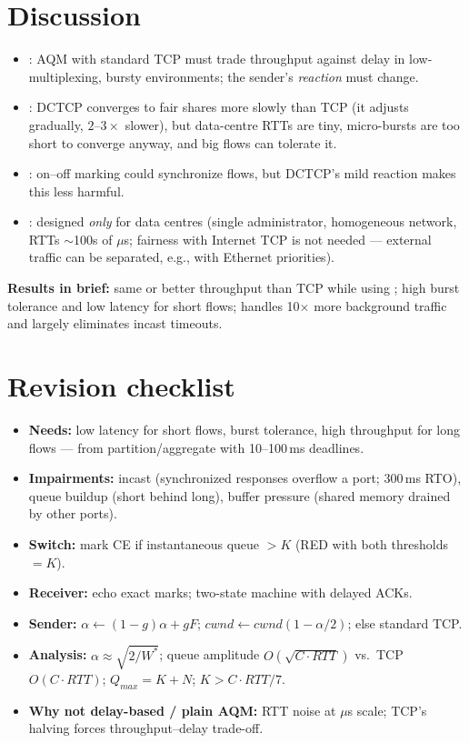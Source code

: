 \section{Discussion}
\begin{itemize}
\item {}: AQM with standard TCP must trade throughput against delay in low-multiplexing, bursty environments; the sender's \emph{reaction} must change.
\item {}: DCTCP converges to fair shares more slowly than TCP (it adjusts gradually, $2$--$3\times$ slower), but data-centre RTTs are tiny, micro-bursts are too short to converge anyway, and big flows can tolerate it.
\item {}: on--off marking could synchronize flows, but DCTCP's mild reaction makes this less harmful.
\item {}: designed \emph{only} for data centres (single administrator, homogeneous network, RTTs $\sim$100s of $\mu$s; fairness with Internet TCP is not needed --- external traffic can be separated, e.g., with Ethernet priorities).
\end{itemize}
\textbf{Results in brief:} same or better throughput than TCP while using ; high burst tolerance and low latency for short flows; handles 10$\times$ more background traffic and largely eliminates incast timeouts.

\section{Revision checklist}
\begin{itemize}
\item \textbf{Needs:} low latency for short flows, burst tolerance, high throughput for long flows --- from partition/aggregate with 10--100\,ms deadlines.
\item \textbf{Impairments:} incast (synchronized responses overflow a port; 300\,ms RTO), queue buildup (short behind long), buffer pressure (shared memory drained by other ports).
\item \textbf{Switch:} mark CE if instantaneous queue $>K$ (RED with both thresholds $=K$).
\item \textbf{Receiver:} echo exact marks; two-state machine with delayed ACKs.
\item \textbf{Sender:} $\alpha \leftarrow (1-g)\alpha + gF$; $cwnd \leftarrow cwnd(1-\alpha/2)$; else standard TCP.
\item \textbf{Analysis:} $\alpha\approx\sqrt{2/W^*}$; queue amplitude $O(\sqrt{C\cdot RTT})$ vs.\ TCP $O(C\cdot RTT)$; $Q_{max}=K+N$; $K > C\cdot RTT/7$.
\item \textbf{Why not delay-based / plain AQM:} RTT noise at $\mu$s scale; TCP's halving forces throughput--delay trade-off.
\end{itemize}
